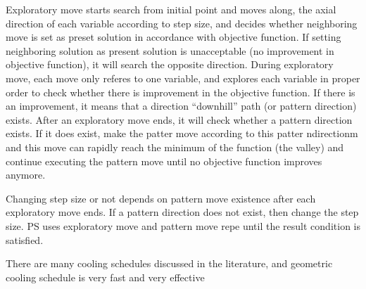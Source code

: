\documentclass[pdftex,11pt]{article}
\begin{document}
Exploratory move starts search from initial point and moves along, the axial direction of each variable according to step size, and decides whether neighboring move is set as preset solution in accordance with objective function. If setting neighboring solution as present solution is unacceptable (no improvement in objective function), it will search the opposite direction. During exploratory move, each move only referes to one variable, and explores each variable in proper order to check whether there is improvement in the objective function. If there is an improvement, it means that a direction ``downhill'' path (or pattern direction) exists. After an exploratory move ends, it will check whether a pattern direction exists. If it does exist, make the patter move according to this patter ndirectionm and this move can rapidly reach the minimum of the function (the valley) and continue executing the pattern move until no objective function improves anymore.

Changing step size or not depends on pattern move existence after each exploratory move ends. If a pattern direction does not exist, then change the step size. PS uses exploratory move and pattern move repe until the result condition is satisfied.

There are many cooling schedules discussed in the literature, and geometric cooling schedule is very fast and very effective
\end{document}
